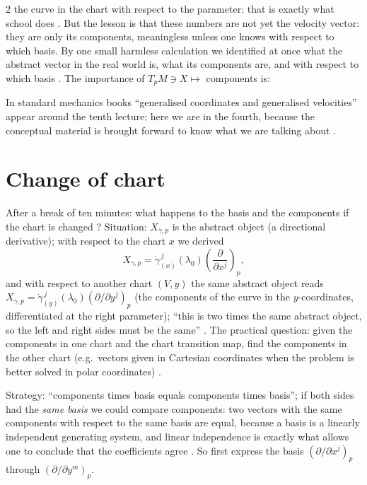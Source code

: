 \begin{paracol}{2}
the curve in the chart with respect to the parameter: that is exactly what school does .
But the lesson is that these numbers are not yet the velocity vector: they are only its components, meaningless unless one knows
with respect to which basis. By one small harmless calculation we identified at once what the abstract vector in the real
world is, what its components are, and with respect to which basis .
The importance of $T_pM\ni X\mapsto$ components is:
\begin{aside}
In standard mechanics books ``generalised coordinates and generalised velocities'' appear around the tenth lecture; here we
are in the fourth, because the conceptual material is brought forward to know what we are talking about
.
\end{aside}

\section{Change of chart}\label{sec:ts-chartchange}

After a break of ten minutes: what happens to the basis and the components if the chart is changed
? Situation: $X_{\gamma,p}$ is the abstract object (a directional
derivative); with respect to the chart $x$ we derived
\[
  X_{\gamma,p}=\dot\gamma^{\,j}_{(x)}(\lambda_0)\left(\frac{\partial}{\partial x^j}\right)_{\!p},
\]
and with respect to another chart $(V,y)$ the same abstract object reads
$X_{\gamma,p}=\dot\gamma^{\,j}_{(y)}(\lambda_0)(\partial/\partial y^j)_p$ (the components of the curve in the $y$-coordinates,
differentiated at the right parameter); ``this is two times the same abstract object, so the left and right sides must be the
same'' .
The practical question: given the components in one chart and the chart transition map, find the components in the other
chart  (e.g.\ vectors given in Cartesian coordinates when the problem
is better solved in polar coordinates) .

Strategy: ``components times basis equals components times basis''; if both sides had the \emph{same basis} we could compare
components: two vectors with the same components with respect to the same basis are equal, because a basis is a linearly
independent generating system, and linear independence is exactly what allows one to conclude that the coefficients agree
.
So first express the basis $(\partial/\partial x^j)_p$ through $(\partial/\partial y^m)_p$.


\end{paracol}
